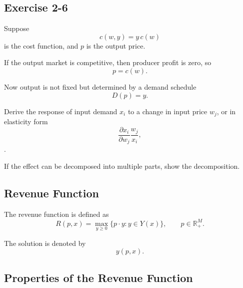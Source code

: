 \begin{tcolorbox}[breakable]

\subsection*{Exercise 2-6}

Suppose
\[
c(w,y)=y\,c(w)
\]
is the cost function, and $p$ is the output price.

If the output market is competitive, then producer profit is zero, so
\[
p=c(w).
\]

Now output is not fixed but determined by a demand schedule
\[
D(p)=y.
\]

Derive the response of input demand $x_i$ to a change in input price $w_j$,
or in elasticity form
\[
\frac{\partial x_i}{\partial w_j} \frac{w_j}{x_i},
\].

If the effect can be decomposed into multiple parts, show the decomposition.

\end{tcolorbox}



\subsection{Revenue Function}

The revenue function is defined as
\[
R(p,x)
=
\max_{y \ge 0} \{p \cdot y : y \in Y(x)\},
\qquad p \in \mathbb{R}_+^M.
\]

The solution is denoted by
\[
y(p,x).
\]

\subsection*{Properties of the Revenue Function}

